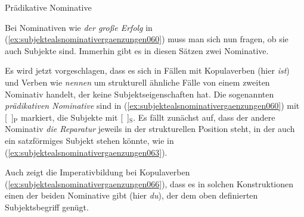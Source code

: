 \begin{Vertiefung}{Prädikative Nominative}

\label{vert:praednom}

\noindent Bei Nominativen wie \textit{der große Erfolg} in (\ref{ex:subjektealsnominativergaenzungen060}) muss man sich nun fragen, ob sie auch Subjekte sind.
Immerhin gibt es in diesen Sätzen zwei Nominative.

\begin{exe}
  \ex\label{ex:subjektealsnominativergaenzungen060}
  \begin{xlist}
  \end{xlist}
\end{exe}

Es wird jetzt vorgeschlagen, dass es sich in Fällen mit Kopulaverben (hier \textit{ist}) und Verben wie \textit{nennen} um strukturell ähnliche Fälle von einem zweiten Nominativ handelt, der keine Subjektseigenschaften hat.
Die sogenannten \textit{prädikativen Nominative} sind in (\ref{ex:subjektealsnominativergaenzungen060}) mit [~]$_\textrm{P}$ markiert, die Subjekte mit [~]$_\textrm{S}$.
Es fällt zunächst auf, dass der andere Nominativ \textit{die Reparatur} jeweils in der strukturellen Position steht, in der auch ein satzförmiges Subjekt stehen könnte, wie in (\ref{ex:subjektealsnominativergaenzungen063}).


\begin{exe}
  \ex\label{ex:subjektealsnominativergaenzungen063}
  \begin{xlist}
  \end{xlist}
\end{exe}

Auch zeigt die Imperativbildung bei Kopulaverben (\ref{ex:subjektealsnominativergaenzungen066}), dass es in solchen Konstruktionen einen der beiden Nominative gibt (hier \textit{du}), der dem oben definierten Subjektsbegriff genügt.

\begin{exe}
  \ex\label{ex:subjektealsnominativergaenzungen066}
  \begin{xlist}
  \end{xlist}
\end{exe}


\end{Vertiefung}
